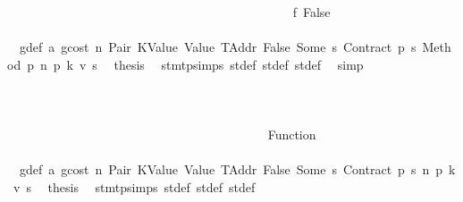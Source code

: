 \begin{isabellebody}
\isanewline
\ \ \ \ \ \ \ \ \ \ \ \ \ \ \ \ \ \ \ \ \ \ \ \ \ \ \ \ \ \ \ \ \ \ \ \ \ \ \ \ \ \ \ \ \isamarkupfalse%
\ f{\isacharcolon}{\kern0pt}\ False\isanewline
\ \ \ \ \ \ \ \ \ \ \ \ \ \ \ \ \ \ \ \ \ \ \ \ \ \ \ \ \ \ \ \ \ \ \ \ \ \ \ \ \ \ \ \ \isamarkupfalse%
\ {}{\isacharparenleft}{\kern0pt}{}{\isacharparenright}{\kern0pt}\ g{\isacharunderscore}{\kern0pt}def\ a{}\ gcost\ n\ Pair\ KValue\ Value\ TAddr\ False\ Some\ s{}\ Contract\ p{}\ s{}\ Method\ p{}\ n{}\ p{}\ k{}\ v\ s{}\ \isamarkupfalse%
\ {\isacharquery}{\kern0pt}thesis\ \isamarkupfalse%
\ stmt{\isachardot}{\kern0pt}psimps{\isacharparenleft}{\kern0pt}{}{\isacharparenright}{\kern0pt}\ st{\isacharprime}{\kern0pt}{\isacharunderscore}{\kern0pt}def\ st{\isacharprime}{\kern0pt}{\isacharprime}{\kern0pt}{\isacharunderscore}{\kern0pt}def\ st{\isacharprime}{\kern0pt}{\isacharprime}{\kern0pt}{\isacharprime}{\kern0pt}{\isacharunderscore}{\kern0pt}def\ \isamarkupfalse%
\ simp\isanewline
\ \ \ \ \ \ \ \ \ \ \ \ \ \ \ \ \ \ \ \ \ \ \ \ \ \ \ \ \ \ \ \ \ \ \ \ \ \ \ \ \ \ \isamarkupfalse%
\isanewline
\ \ \ \ \ \ \ \ \ \ \ \ \ \ \ \ \ \ \ \ \ \ \ \ \ \ \ \ \ \ \ \ \ \ \ \ \ \ \ \ \isamarkupfalse%
\isanewline
\ \ \ \ \ \ \ \ \ \ \ \ \ \ \ \ \ \ \ \ \ \ \ \ \ \ \ \ \ \ \ \ \ \ \ \ \ \ \isamarkupfalse%
\isanewline
\ \ \ \ \ \ \ \ \ \ \ \ \ \ \ \ \ \ \ \ \ \ \ \ \ \ \ \ \ \ \ \ \ \ \ \ \ \ \ \ \isamarkupfalse%
\ {\isacharparenleft}{\kern0pt}Function\ {\isacharunderscore}{\kern0pt}{\isacharparenright}{\kern0pt}\isanewline
\ \ \ \ \ \ \ \ \ \ \ \ \ \ \ \ \ \ \ \ \ \ \ \ \ \ \ \ \ \ \ \ \ \ \ \ \ \ \ \ \isamarkupfalse%
\ {}{\isacharparenleft}{\kern0pt}{}{\isacharparenright}{\kern0pt}\ g{\isacharunderscore}{\kern0pt}def\ a{}\ gcost\ n\ Pair\ KValue\ Value\ TAddr\ False\ Some\ s{}\ Contract\ p{}\ s{}\ n{}\ p{}\ k{}\ v\ s{}\ \isamarkupfalse%
\ {\isacharquery}{\kern0pt}thesis\ \isamarkupfalse%
\ stmt{\isachardot}{\kern0pt}psimps{\isacharparenleft}{\kern0pt}{}{\isacharparenright}{\kern0pt}\ st{\isacharprime}{\kern0pt}{\isacharunderscore}{\kern0pt}def\ st{\isacharprime}{\kern0pt}{\isacharprime}{\kern0pt}{\isacharunderscore}{\kern0pt}def\ st{\isacharprime}{\kern0pt}{\isacharprime}{\kern0pt}{\isacharprime}{\kern0pt}{\isacharunderscore}{\kern0pt}def\ \isamarkupfalse%

\end{isabellebody}
